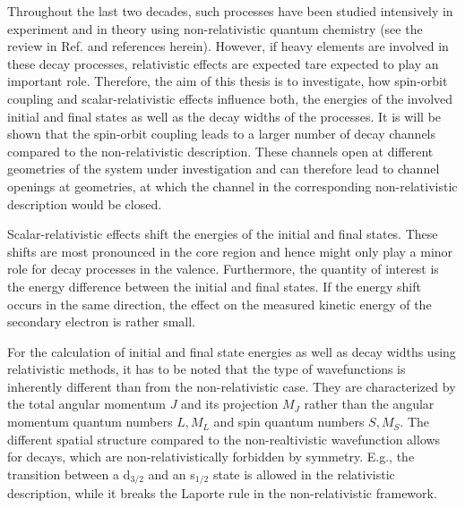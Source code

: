 Throughout the last two decades, such processes have been studied intensively
in experiment 
and in theory using non-relativistic quantum chemistry
(see the review in Ref. \cite{Hergenhahn11} and references herein).
However, if heavy elements are involved in these decay processes, relativistic
effects are expected tare expected to play an important role.
Therefore, the aim of this
thesis is to investigate, how spin-orbit coupling and scalar-relativistic
effects influence both, the energies of the involved initial and final states
as well as the decay widths of the processes.
It is will be shown that the spin-orbit coupling leads to a larger number
of decay channels compared to the non-relativistic description. These channels
open at different geometries of the system under investigation and
can therefore lead to channel openings at geometries, at which the channel
in the corresponding non-relativistic description would be closed.

Scalar-relativistic effects shift the energies of the initial and final states.
These shifts are most pronounced in the core region and hence might only play
a minor role for decay processes in the valence. Furthermore, the
quantity of interest is the energy difference between the initial and final
states. If the
energy shift occurs in the same direction, the effect on the measured kinetic
energy of the secondary electron is rather small.

For the calculation of initial and final state energies as well as decay widths
using relativistic methods, it has to be noted that the type of
wavefunctions is inherently different than from the non-relativistic case. They
are characterized by the total angular momentum $J$ and its projection $M_J$ rather
than the angular momentum quantum numbers $L,M_L$ and spin quantum numbers
$S,M_S$. The different spatial structure compared to the non-realtivistic
wavefunction allows
for decays, which are non-relativistically forbidden by symmetry. E.g., the
transition between a d$_{3/2}$ and an s$_{1/2}$ state is allowed in the
relativistic description, while it breaks the Laporte rule in the non-relativistic
framework.

